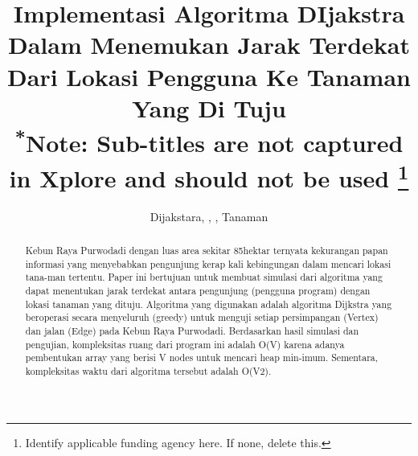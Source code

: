 \documentclass[conference]{IEEEtran}
\begin{document}
\title{Implementasi Algoritma DIjakstra Dalam Menemukan Jarak Terdekat Dari Lokasi Pengguna Ke Tanaman Yang Di Tuju\\
{\footnotesize \textsuperscript{*}Note: Sub-titles are not captured in Xplore and
should not be used}
\thanks{Identify applicable funding agency here. If none, delete this.}
}

\author{


\maketitle

\begin{abstract}
Kebun Raya Purwodadi dengan luas area sekitar 85hektar ternyata kekurangan papan informasi yang menyebabkan pengunjung kerap kali kebingungan dalam mencari lokasi tana-man tertentu. Paper ini bertujuan untuk membuat simulasi
dari algoritma yang dapat menentukan jarak terdekat antara pengunjung (pengguna program) dengan lokasi tanaman yang dituju. Algoritma yang digunakan adalah algoritma Dijkstra yang beroperasi secara menyeluruh (greedy) untuk menguji
setiap persimpangan (Vertex) dan jalan (Edge) pada Kebun Raya Purwodadi. Berdasarkan hasil simulasi dan pengujian, kompleksitas ruang dari program ini adalah O(V) karena adanya
pembentukan array yang berisi V nodes untuk mencari heap min-imum. Sementara, kompleksitas waktu dari algoritma tersebut adalah O(V2).
\end{abstract}

\begin{IEEEkeywords}
Dijakstara, \Veriex, \Edge, Tanaman 
\end{IEEEkeywords}

}
\end{document}
